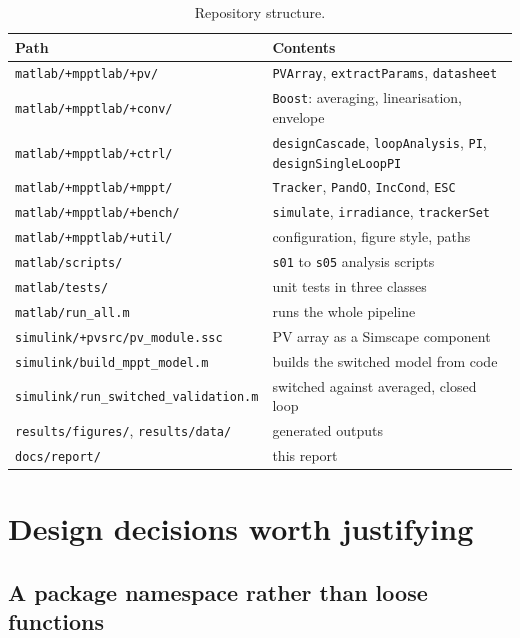 \begin{table}[htbp]
\centering
\caption{Repository structure.}
\label{tab:repo}
\small
\begin{tabular}{@{}>{\raggedright\arraybackslash}p{}>{\raggedright\arraybackslash}p{}@{}}
\toprule
\textbf{Path} & \textbf{Contents} \\
\midrule
\texttt{matlab/+mpptlab/+pv/} & \texttt{PVArray}, \texttt{extractParams}, \texttt{datasheet} \\
\texttt{matlab/+mpptlab/+conv/} & \texttt{Boost}: averaging, linearisation, envelope \\
\texttt{matlab/+mpptlab/+ctrl/} & \texttt{designCascade}, \texttt{loopAnalysis}, \texttt{PI}, \texttt{designSingleLoopPI} \\
\texttt{matlab/+mpptlab/+mppt/} & \texttt{Tracker}, \texttt{PandO}, \texttt{IncCond}, \texttt{ESC} \\
\texttt{matlab/+mpptlab/+bench/} & \texttt{simulate}, \texttt{irradiance}, \texttt{trackerSet} \\
\texttt{matlab/+mpptlab/+util/} & configuration, figure style, paths \\
\texttt{matlab/scripts/} & \texttt{s01} to \texttt{s05} analysis scripts \\
\texttt{matlab/tests/} & 27 unit tests in three classes \\
\texttt{matlab/run\_all.m} & runs the whole pipeline \\
\texttt{simulink/+pvsrc/pv\_module.ssc} & PV array as a Simscape component \\
\texttt{simulink/build\_mppt\_model.m} & builds the switched model from code \\
\texttt{simulink/run\_switched\_validation.m} & switched against averaged, closed loop \\
\texttt{results/figures/}, \texttt{results/data/} & generated outputs \\
\texttt{docs/report/} & this report \\
\bottomrule
\end{tabular}
\end{table}

\section{Design decisions worth justifying}

\subsection{A package namespace rather than loose functions}

